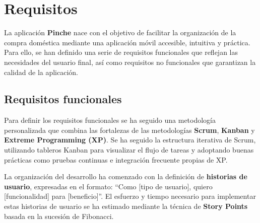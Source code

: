



\section{Requisitos}
\label{sec:requisitos}

La aplicación \textbf{Pinche} nace con el objetivo de facilitar la organización de la compra doméstica mediante una aplicación móvil accesible, intuitiva y práctica. Para ello, se han definido una serie de requisitos funcionales que reflejan las necesidades del usuario final, así como requisitos no funcionales que garantizan la calidad de la aplicación.

\subsection{Requisitos funcionales}

Para definir los requisitos funcionales se ha seguido una metodología personalizada que combina las fortalezas de las metodologías \textbf{Scrum}, \textbf{Kanban} y \textbf{Extreme Programming (XP)}. Se ha seguido la estructura iterativa de Scrum, utilizando tableros Kanban para visualizar el flujo de tareas y adoptando buenas prácticas como pruebas continuas e integración frecuente propias de XP.

La organización del desarrollo ha comenzado con la definición de \textbf{historias de usuario}, expresadas en el formato: ``Como [tipo de usuario], quiero [funcionalidad] para [beneficio]''. El esfuerzo y tiempo necesario para implementar estas historias de usuario se ha estimado mediante la técnica de \textbf{Story Points} basada en la sucesión de Fibonacci.

